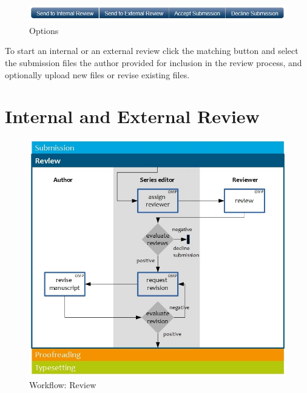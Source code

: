 \begin{figure}[h] \centering
\includegraphics[width=1\textwidth]{./img/options.jpg} \caption{Options}
\label{fig:options}
\end{figure}

To start an internal or an external review click the matching button and select the submission files the author provided for inclusion in the review process, and optionally upload new files or revise existing files. %


\newpage


\section{Internal and External Review} 

\begin{figure}[h] \centering
\includegraphics[width=1\textwidth]{./img/workflow_review.jpg} \caption{Workflow:  Review}
\label{fig:review}
\end{figure}

